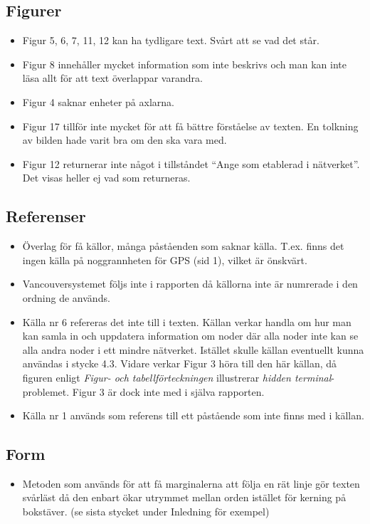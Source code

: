 \documentclass[a4paper,11pt]{article}
\begin{document}
\subsection{Figurer}

\begin{itemize}
   \item Figur 5, 6, 7, 11, 12 kan ha tydligare text. Svårt att se vad det står.
   \item Figur 8 innehåller mycket information som inte beskrivs och man kan inte läsa allt för att text överlappar varandra.
   \item Figur 4 saknar enheter på axlarna.
   \item Figur 17 tillför inte mycket för att få bättre förståelse av texten. En tolkning av bilden hade varit bra om den ska vara med.
   \item Figur 12 returnerar inte något i tillståndet “Ange som etablerad i nätverket”. Det visas heller ej vad som returneras.
\end{itemize}

\subsection{Referenser}

\begin{itemize}
   \item Överlag för få källor, många påståenden som saknar källa. T.ex. finns det ingen källa på noggrannheten för GPS (sid 1), vilket är önskvärt.
   \item Vancouversystemet följs inte i rapporten då källorna inte är numrerade i den ordning de används.
   \item Källa nr 6 refereras det inte till i texten. Källan verkar handla om hur man kan samla in och uppdatera information om noder där alla noder inte kan se alla andra noder i ett mindre nätverket. Istället skulle källan eventuellt kunna användas i stycke 4.3. Vidare verkar Figur 3 höra till den här källan, då figuren enligt \emph{Figur- och tabellförteckningen} illustrerar \emph{hidden terminal}-problemet. Figur 3 är dock inte med i själva rapporten.
   \item Källa nr 1 används som referens till ett påstående som inte finns med i källan.
\end{itemize}

\subsection{Form}

\begin{itemize}
   \item Metoden som används för att få marginalerna att följa en rät linje gör texten svårläst då den enbart ökar utrymmet mellan orden istället för kerning på bokstäver. (se sista stycket under Inledning för exempel)
\end{itemize}
\end{document}
